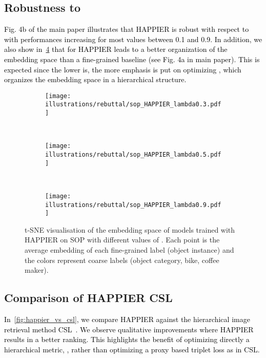 \subsection{Robustness to }

\textcolor{black}{Fig. 4b of the main paper illustrates that HAPPIER is robust with respect to  with performances increasing for most values between 0.1 and 0.9. In addition, we also show in~\cref{fig:tsne_sup} that for  HAPPIER leads to a better organization of the embedding space than a fine-grained baseline (see Fig. 4a in main paper). This is expected since the lower  is, the more emphasis is put on optimizing , which organizes the embedding space in a hierarchical structure.}


\begin{figure}[ht]
    \centering
        
    \begin{subfigure}[ht]{0.3\textwidth}
        \texttt{[image: illustrations/rebuttal/sop\_HAPPIER\_lambda0.3.pdf]}
        \caption{}
        \label{fig:tsne_happier_03}
    \end{subfigure}
    ~
    \begin{subfigure}[ht]{0.3\textwidth}
    \texttt{[image: illustrations/rebuttal/sop\_HAPPIER\_lambda0.5.pdf]}
    \caption{}
    \label{fig:tsne_happier_05}
    \end{subfigure}~
    \begin{subfigure}[ht]{0.3\textwidth}
    \texttt{[image: illustrations/rebuttal/sop\_HAPPIER\_lambda0.9.pdf]}
    \caption{}
    \label{fig:tsne_happier_09}
    \end{subfigure}

    \caption{t-SNE visualisation of the embedding space of models trained with HAPPIER on SOP with different values of . Each point is the average embedding of each fine-grained label (object instance) and the colors represent coarse labels (object category, \eg bike, coffee maker).}
    \label{fig:tsne_sup}
\end{figure}


\subsection{Comparison of HAPPIER \vs CSL}

\textcolor{black}{In~\cref{fig:happier_vs_csl}, we compare HAPPIER against the hierarchical image retrieval method CSL~\cite{sun2021dynamic}. We observe qualitative improvements where HAPPIER results in a better ranking. This highlights the benefit of optimizing directly a hierarchical metric, \ie , rather than optimizing a proxy based triplet loss as in CSL.}

